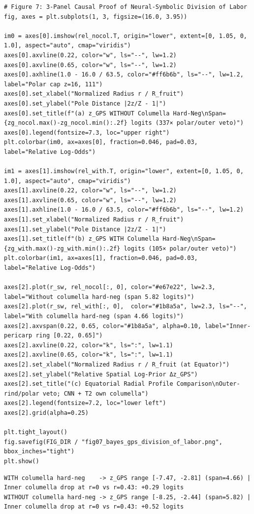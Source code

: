 \documentclass[10pt,a4paper]{article}
\renewcommand{\_}{\origunderscore\allowbreak}
\begin{document}
\begin{codebox}
\begin{lstlisting}[style=pybmed]
# Figure 7: 3-Panel Causal Proof of Neural-Symbolic Division of Labor
fig, axes = plt.subplots(1, 3, figsize=(16.0, 3.95))

im0 = axes[0].imshow(rel_nocol.T, origin="lower", extent=[0, 1.05, 0, 1.0], aspect="auto", cmap="viridis")
axes[0].axvline(0.22, color="w", ls="--", lw=1.2)
axes[0].axvline(0.65, color="w", ls="--", lw=1.2)
axes[0].axhline(1.0 - 16.0 / 63.5, color="#ff6b6b", ls="--", lw=1.2, label="Polar cap z=16, 111")
axes[0].set_xlabel("Normalized Radius r / R_fruit")
axes[0].set_ylabel("Pole Distance |2z/Z - 1|")
axes[0].set_title(f"(a) z_GPS WITHOUT Columella Hard-Neg\nSpan={zg_nocol.max()-zg_nocol.min():.2f} logits (337× polar/outer veto)")
axes[0].legend(fontsize=7.3, loc="upper right")
plt.colorbar(im0, ax=axes[0], fraction=0.046, pad=0.03, label="Relative Log-Odds")

im1 = axes[1].imshow(rel_with.T, origin="lower", extent=[0, 1.05, 0, 1.0], aspect="auto", cmap="viridis")
axes[1].axvline(0.22, color="w", ls="--", lw=1.2)
axes[1].axvline(0.65, color="w", ls="--", lw=1.2)
axes[1].axhline(1.0 - 16.0 / 63.5, color="#ff6b6b", ls="--", lw=1.2)
axes[1].set_xlabel("Normalized Radius r / R_fruit")
axes[1].set_ylabel("Pole Distance |2z/Z - 1|")
axes[1].set_title(f"(b) z_GPS WITH Columella Hard-Neg\nSpan={zg_with.max()-zg_with.min():.2f} logits (105× polar/outer veto)")
plt.colorbar(im1, ax=axes[1], fraction=0.046, pad=0.03, label="Relative Log-Odds")

axes[2].plot(r_sw, rel_nocol[:, 0], color="#e67e22", lw=2.3, label="Without columella hard-neg (span 5.82 logits)")
axes[2].plot(r_sw, rel_with[:, 0],  color="#1b8a5a", lw=2.3, ls="--", label="With columella hard-neg (span 4.66 logits)")
axes[2].axvspan(0.22, 0.65, color="#1b8a5a", alpha=0.10, label="Inner-pericarp ring [0.22, 0.65]")
axes[2].axvline(0.22, color="k", ls=":", lw=1.1)
axes[2].axvline(0.65, color="k", ls=":", lw=1.1)
axes[2].set_xlabel("Normalized Radius r / R_fruit (at Equator)")
axes[2].set_ylabel("Relative Spatial Log-Prior Δz_GPS")
axes[2].set_title("(c) Equatorial Radial Profile Comparison\nOuter-rind/polar veto; CNN + T2 own columella")
axes[2].legend(fontsize=7.2, loc="lower left")
axes[2].grid(alpha=0.25)

plt.tight_layout()
fig.savefig(FIG_DIR / "fig07_bayes_gps_division_of_labor.png", bbox_inches="tight")
plt.show()
\end{lstlisting}
\end{codebox}
\begin{outbox}
\begin{lstlisting}[style=outbmed]
WITH columella hard-neg    -> z_GPS range [-7.47, -2.81] (span=4.66) | Inner columella drop at r=0 vs r=0.43: +0.29 logits
WITHOUT columella hard-neg -> z_GPS range [-8.25, -2.44] (span=5.82) | Inner columella drop at r=0 vs r=0.43: +0.52 logits
\end{lstlisting}
\end{outbox}
\end{document}
